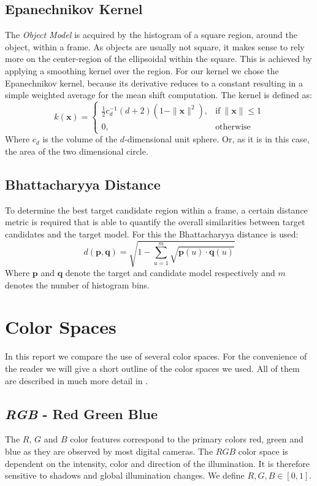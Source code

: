 \documentclass[11pt]{article}
\begin{document}
\subsection{Epanechnikov Kernel}
The \emph{Object Model} is acquired by the histogram of a square region, around
the object, within a frame. As objects are usually not square, it makes sense
to rely more on the center-region of the ellipsoidal within the square. This is
achieved by applying a smoothing kernel over the region. For our kernel we
chose the Epanechnikov kernel, because its derivative reduces to a constant
resulting in a simple weighted average for the mean shift computation. The
kernel is defined as:
\begin{equation}
k(\mathbf{x}) = \left\{
\begin{array}{ll}
\frac{1}{2}c^{-1}_d(d+2)(1-\|\mathbf{x}\|^2), & \textrm{if}~\|\mathbf{x}\| \leq 1 \\
0, & \textrm{otherwise}
\end{array}
\right.
\end{equation}
Where $c_d$ is the volume of the $d$-dimensional unit sphere. Or, as it is in
this case, the area of the two dimensional circle.

\subsection{Bhattacharyya Distance}
To determine the best target candidate region within a frame, a certain
distance metric is required that is able to quantify the overall similarities
between target candidates and the target model. For this the Bhattacharyya
distance is used:
\begin{equation}
d(\mathbf{p},\mathbf{q}) = \sqrt{1 - \sum^m_{u=1} \sqrt{\mathbf{p}(u) \cdot \mathbf{q}(u)}}
\end{equation}
Where $\mathbf{p}$ and $\mathbf{q}$ denote the target and candidate model respectively and $m$
denotes the number of histogram bins.

\section{Color Spaces} \label{sec:color}
In this report we compare the use of several color spaces. For the convenience
of the reader we will give a short outline of the color spaces we used. All of
them are described in much more detail in \cite{Gevers}.

\subsection{\textit{RGB} - Red Green Blue}
The $R$, $G$ and $B$  color features correspond to the primary colors red,
green and blue as they are observed by most digital cameras. The
$RGB$ color space is dependent on the intensity, color and direction of the
illumination. It is therefore sensitive to shadows and global illumination
changes. We define $R, G, B \in [0,1]$.
\end{document}
